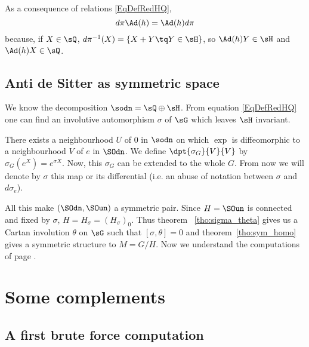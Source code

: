 As a consequence of relations \eqref{EqDefRedHQ},
\begin{equation}  \label{EqdpiAdpi}
d\pi\Ad(h)=\Ad(h) d\pi
\end{equation}
because, if $X\in\sQ$, $d\pi^{-1}(X)=\{ X+Y\tq Y\in\sH \}$, so $\Ad(h)Y\in\sH$ and $\Ad(h)X\in \sQ$.

\subsection{Anti de Sitter as symmetric space}
\label{pg:AdS_n_syme}

We know the decomposition $\sodn=\sQ\oplus\sH$. From equation \eqref{EqDefRedHQ} one can find an involutive automorphism $\sigma$ of $\sG$ which leaves $\sH$ invariant.

There exists a neighbourhood $U$ of $0$ in $\sodn$ on which $\exp$ is diffeomorphic to a neighbourhood $V$ of $e$ in $\SOdn$. We define $\dpt{\sigma_G}{V}{V}$ by $\sigma_G(e^X)=e^{\sigma X}$. Now, this $\sigma_G$ can be extended to the whole $G$. From now we will denote by $\sigma$ this map or its differential (i.e. an abuse of notation between $\sigma$ and $d\sigma_e$).


All this make $(\SOdn,\SOun)$ a symmetric pair. Since $H=\SOun$ is connected and fixed by $\sigma$, $H=H_{\sigma}=(H_{\sigma})_0$. Thus theorem ~\ref{tho:sigma_theta} gives us a Cartan involution $\theta$ on $\sG$ such that $[\sigma,\theta]=0$ and theorem~\ref{tho:sym_homo} gives a symmetric structure to $M=G/H$. Now we understand the computations of page \pageref{pg:calcul_sigma_theta}.

\section{Some complements}

\subsection{A first brute force computation}

